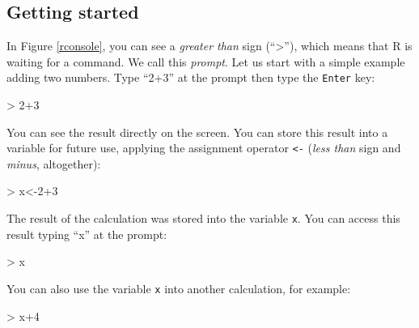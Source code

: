 \documentclass[letterpaper,12pt,oneside]{article}
\begin{document}
\subsection{Getting started}

In Figure \ref{rconsole}, you can see a {\it greater than} sign (``>''), which means that R is waiting for a command. We call this {\it prompt}. Let us start with a simple example adding two numbers. Type ``2+3'' at the prompt then type the {\tt Enter} key:
\begin{Schunk}
\begin{Sinput}
> 2+3
\end{Sinput}
\end{Schunk}
You can see the result directly on the screen. You can store this result into a variable for future use, applying the assignment operator {\tt <-} ({\it less than} sign and {\it minus}, altogether):
\begin{Schunk}
\begin{Sinput}
> x<-2+3
\end{Sinput}
\end{Schunk}
The result of the calculation was stored into the variable {\tt x}. You can access this result typing ``x'' at the prompt:
\begin{Schunk}
\begin{Sinput}
> x
\end{Sinput}
\end{Schunk}
You can also use the variable {\tt x} into another calculation, for example:
\begin{Schunk}
\begin{Sinput}
> x+4
\end{Sinput}
\end{Schunk}
\end{document}
